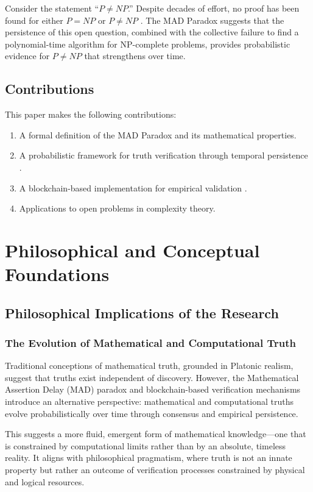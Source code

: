 \documentclass[11pt]{article}
\begin{document}
Consider the statement ``$P \neq NP$.'' Despite decades of effort, no proof has been found for either $P = NP$ or $P \neq NP$ \cite{Cook1971}. The MAD Paradox suggests that the persistence of this open question, combined with the collective failure to find a polynomial-time algorithm for NP-complete problems, provides probabilistic evidence for $P \neq NP$ that strengthens over time.

\subsection{Contributions}

This paper makes the following contributions:
\begin{enumerate}[label=(\arabic*)]
    \item A formal definition of the MAD Paradox and its mathematical properties.
    \item A probabilistic framework for truth verification through temporal persistence \cite{BenSasson2018}.
    \item A blockchain-based implementation for empirical validation \cite{Buterin2014}.
    \item Applications to open problems in complexity theory.
\end{enumerate}

\section{Philosophical and Conceptual Foundations}
\subsection{Philosophical Implications of the Research}

\subsubsection{The Evolution of Mathematical and Computational Truth}
Traditional conceptions of mathematical truth, grounded in Platonic realism, suggest that truths exist independent of discovery. However, the Mathematical Assertion Delay (MAD) paradox and blockchain-based verification mechanisms introduce an alternative perspective: mathematical and computational truths evolve probabilistically over time through consensus and empirical persistence.

This suggests a more fluid, emergent form of mathematical knowledge—one that is constrained by computational limits rather than by an absolute, timeless reality. It aligns with philosophical pragmatism, where truth is not an innate property but rather an outcome of verification processes constrained by physical and logical resources.
\end{document}
